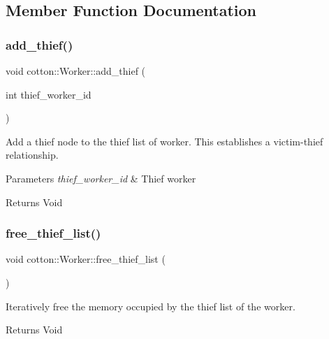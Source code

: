 \subsection{Member Function Documentation}
\mbox{\label{structcotton_1_1Worker_a8e28883823dae5e4c840236ab7168c00}} 
\subsubsection{\texorpdfstring{add\+\_\+thief()}{add\_thief()}}
{\footnotesize\ttfamily void cotton\+::\+Worker\+::add\+\_\+thief (\begin{DoxyParamCaption}\item[{int}]{thief\+\_\+worker\+\_\+id }\end{DoxyParamCaption})}

Add a thief node to the thief list of worker. This establishes a victim-\/thief relationship.


\begin{DoxyParams}{Parameters}
{\em thief\+\_\+worker\+\_\+id} & Thief worker \\
\hline
\end{DoxyParams}
\begin{DoxyReturn}{Returns}
Void 
\end{DoxyReturn}
\mbox{\label{structcotton_1_1Worker_a2c5e25bbc0b0e2417281ed2832b728a5}} 
\subsubsection{\texorpdfstring{free\+\_\+thief\+\_\+list()}{free\_thief\_list()}}
{\footnotesize\ttfamily void cotton\+::\+Worker\+::free\+\_\+thief\+\_\+list (\begin{DoxyParamCaption}{ }\end{DoxyParamCaption})}

Iteratively free the memory occupied by the thief list of the worker.

\begin{DoxyReturn}{Returns}
Void 
\end{DoxyReturn}
\mbox{\label{structcotton_1_1Worker_a1c6114b25a55f514124704d2073a9a9a}} 
